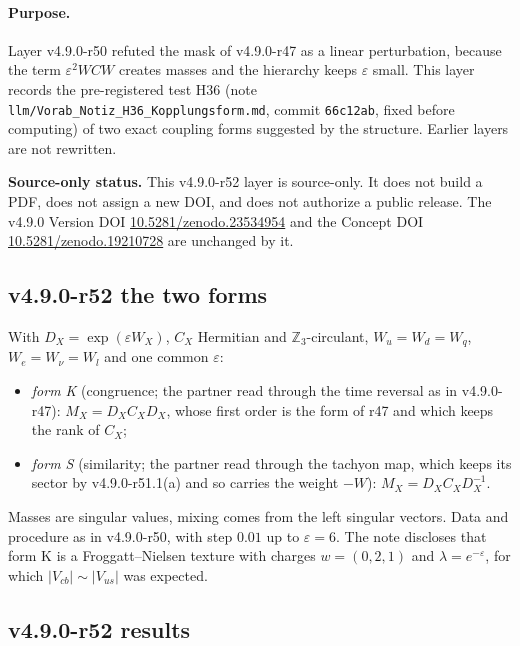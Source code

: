\paragraph{Purpose.}
Layer v4.9.0-r50 refuted the mask of v4.9.0-r47 as a linear perturbation, because the term \(\varepsilon^2WCW\) creates masses and the hierarchy
keeps \(\varepsilon\) small.  This layer records the pre-registered test H36 (note \texttt{llm/Vorab\_Notiz\_H36\_Kopplungsform.md}, commit
\texttt{66c12ab}, fixed before computing) of two exact coupling forms suggested by the structure.  Earlier layers are not rewritten.

\noindent\textbf{Source-only status.}
This v4.9.0-r52 layer is source-only.  It does not build a PDF, does not assign a new DOI,
and does not authorize a public release.  The v4.9.0 Version DOI
\href{https://doi.org/10.5281/zenodo.23534954}{10.5281/zenodo.23534954} and the Concept DOI
\href{https://doi.org/10.5281/zenodo.19210728}{10.5281/zenodo.19210728} are unchanged by it.

\subsection*{v4.9.0-r52 the two forms}
\label{subsec:v490-r52-forms}

With \(D_X=\exp(\varepsilon W_X)\), \(C_X\) Hermitian and \(\mathbb Z_3\)-circulant, \(W_u=W_d=W_q\), \(W_e=W_\nu=W_l\) and one common
\(\varepsilon\):
\begin{itemize}[leftmargin=2em]
\item \emph{form K} (congruence; the partner read through the time reversal as in v4.9.0-r47): \(M_X=D_XC_XD_X\), whose first order is the form of
r47 and which keeps the rank of \(C_X\);
\item \emph{form S} (similarity; the partner read through the tachyon map, which keeps its sector by v4.9.0-r51.1(a) and so carries the weight
\(-W\)): \(M_X=D_XC_XD_X^{-1}\).
\end{itemize}
Masses are singular values, mixing comes from the left singular vectors.  Data and procedure as in v4.9.0-r50, with step \(0.01\) up to
\(\varepsilon=6\).  The note discloses that form K is a Froggatt--Nielsen texture with charges \(w=(0,2,1)\) and \(\lambda=e^{-\varepsilon}\), for
which \(|V_{cb}|\sim|V_{us}|\) was expected.

\subsection*{v4.9.0-r52 results}
\label{subsec:v490-r52-results}

